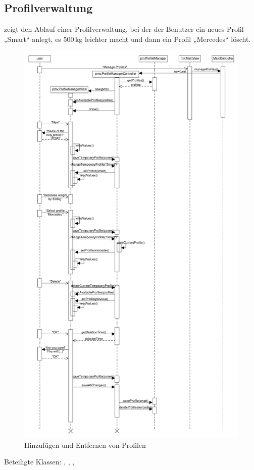 \documentclass[a4paper, 11pt]{article}
\begin{document}
\subsection{Profilverwaltung}
 zeigt den Ablauf einer Profilverwaltung, bei der der Benutzer ein neues Profil „Smart“ anlegt, es 500\,kg leichter macht und dann ein Profil „Mercedes“ löscht.
\begin{figure}[H]
\centering
\includegraphics[height=0.8\textheight]{ProfilSequenz}
\caption{Hinzufügen und Entfernen von Profilen}
\label{fig:sequenz_profilVerwaltung}
\end{figure}
Beteiligte Klassen: , , , 
\end{document}
